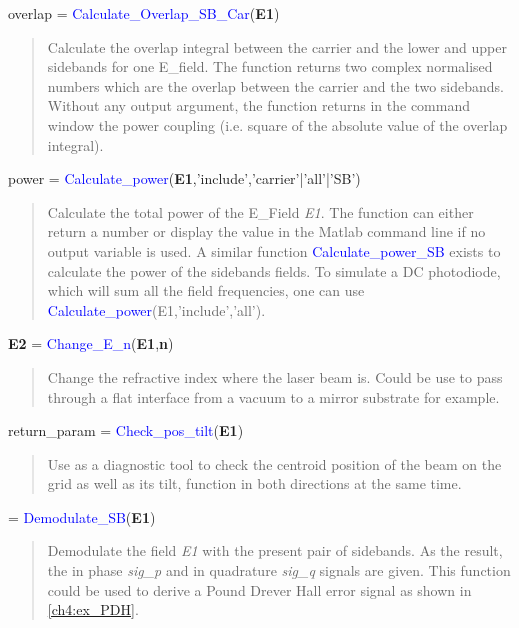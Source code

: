 \noindent overlap = \textcolor{blue}{Calculate\_Overlap\_SB\_Car}(\textbf{E1})
\vspace*{-0.2cm}
\begin{quote}
Calculate the overlap integral between the carrier and the lower and upper sidebands for one E\_field. The function returns two complex normalised numbers which are the overlap between the carrier and the two sidebands. Without any output argument, the function returns in the command window the power coupling (i.e. square of the absolute value of the overlap integral).
\end{quote}

\noindent power = \textcolor{blue}{Calculate\_power}(\textbf{E1},'include','carrier'|'all'|'SB')
\vspace*{-0.2cm}
\begin{quote}
Calculate the total power of the E\_Field \textsl{E1}. The function can either return a number or display the value in the Matlab command line if no output variable is used. A similar function \textcolor{blue}{Calculate\_power\_SB} exists to calculate the power of the sidebands fields.
To simulate a DC photodiode, which will sum all the field frequencies, one can use  \textcolor{blue}{Calculate\_power}(E1,'include','all').
\end{quote}

\noindent \textbf{E2} = \textcolor{blue}{Change\_E\_n}(\textbf{E1},\textbf{n})
\vspace*{-0.2cm}
\begin{quote}
Change the refractive index where the laser beam is. Could be use to pass through a flat interface from a vacuum to a mirror substrate for example.
\end{quote}

\noindent return\_param = \textcolor{blue}{Check\_pos\_tilt}(\textbf{E1})
\vspace*{-0.2cm}
\begin{quote}
Use as a diagnostic tool to check the centroid position of the beam on the grid as well as its tilt, function in both directions at the same time.
\end{quote}

 = \textcolor{blue}{Demodulate\_SB}(\textbf{E1})
\vspace*{-0.2cm}
\begin{quote}
Demodulate the field \textsl{E1} with the present pair of sidebands. As the result, the in phase \textsl{sig\_p} and in quadrature \textsl{sig\_q} signals are given. This function could be used to derive a Pound Drever Hall error signal as shown in \ref{ch4:ex_PDH}.
\end{quote}

